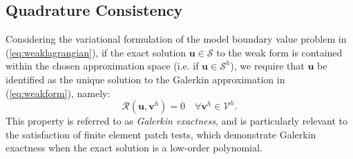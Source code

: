 \subsection*{Quadrature Consistency}

Considering the variational formulation of the model boundary value problem in (\ref{eq:weaklagrangian}), if the exact solution $\bm{u} \in \mathcal{S}$ to the weak form is contained within the chosen approximation space (i.e. if $\bm{u} \in \mathcal{S}^h$), we require that $\bm{u}$ be identified as the unique solution to the Galerkin approximation in (\ref{eq:weakform}), namely:
\begin{equation}
  \mathcal{R}(\bm{u}, \bm{v}^h) = 0 \quad \forall \bm{v}^h \in \mathcal{V}^h.
\end{equation}
This property is referred to as \textit{Galerkin exactness}, and is particularly relevant to the satisfaction of finite element patch tests, which demonstrate Galerkin exactness when the exact solution is a low-order polynomial.

